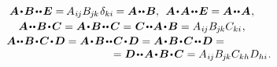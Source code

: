 \begin{equation}
\begin{array}{c}
\\[.2em]
%
\bm{A} \narrowdotp \bm{B} \narrowdotdotp \UnitDyad = \hspace{-0.16ex} A_{\hspace{.1ex}i\hspace{-0.1ex}j} B_{\hspace{-0.1ex}j\hspace{-0.1ex}k} \hspace{.2ex} \delta_{ki} \hspace{-0.1ex} = \bm{A} \narrowdotdotp \bm{B} ,
\:\:
\bm{A} \narrowdotp \bm{A} \narrowdotdotp \UnitDyad = \bm{A} \narrowdotdotp \bm{A}
\hspace{.12ex} ,
\\[.2em]
%
\bm{A} \narrowdotdotp \bm{B} \narrowdotp \bm{C} = \bm{A} \narrowdotp \bm{B} \narrowdotdotp \hspace{.1ex} \bm{C} = \hspace{.1ex} \bm{C} \narrowdotdotp \hspace{-0.1ex} \bm{A} \narrowdotp \bm{B} = A_{\hspace{.1ex}i\hspace{-0.1ex}j} B_{\hspace{-0.1ex}j\hspace{-0.1ex}k} C_{ki} \hspace{.1ex} ,
\\[.15em]
%
\bm{A} \hspace{-0.1ex}\narrowdotdotp \bm{B} \narrowdotp \bm{C} \narrowdotp \bm{D} = \bm{A} \narrowdotp \bm{B} \narrowdotdotp \bm{C} \narrowdotp \bm{D} = \bm{A} \narrowdotp \bm{B} \narrowdotp \bm{C} \narrowdotdotp \bm{D} = \hspace*{3em} \\
\hspace{11em} = \bm{D} \narrowdotdotp \bm{A} \narrowdotp \bm{B} \narrowdotp \bm{C} = A_{\hspace{.1ex}i\hspace{-0.1ex}j} B_{\hspace{-0.1ex}j\hspace{-0.1ex}k} C_{kh} D_{hi} \hspace{.1ex}.
\end{array}
\end{equation}

